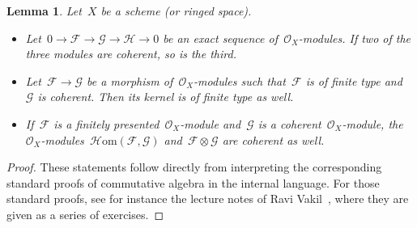 \documentclass[10pt]{amsart}
\theoremstyle{definition}
\theoremstyle{plain}
\newtheorem{lemma}[defn]{Lemma}
\theoremstyle{remark}
\newcommand{\F}{\mathcal{F}}
\renewcommand{\G}{\mathcal{G}}
\renewcommand{\H}{\mathcal{H}}
\renewcommand{\O}{\mathcal{O}}
\newcommand{\HOM}{\mathcal{H}\mathrm{om}}
\newcommand{\?}{\,{:}\,}
\renewcommand{\_}{\mathpunct{.}\,}
\begin{document}
\begin{lemma}\label{lemma:coherent-stuff}
Let~$X$ be a scheme (or ringed space).
\begin{itemize}
\item Let~$0 \to \F \to \G \to \H \to 0$ be an exact sequence
of~$\O_X$-modules. If two of the three modules are coherent, so is the third.
\item Let~$\F \to \G$ be a morphism of~$\O_X$-modules such that~$\F$ is
of finite type and~$\G$ is coherent. Then its kernel is of finite type as well.
\item If~$\F$ is a finitely presented~$\O_X$-module and~$\G$ is a
coherent~$\O_X$-module, the~$\O_X$-modules~$\HOM(\F,\G)$ and~$\F \otimes \G$
are coherent as well.
\end{itemize}
\end{lemma}
\begin{proof}These statements follow directly from interpreting the
corresponding standard proofs of commutative algebra in the internal language.
For those standard proofs, see for instance the lecture notes of Ravi
Vakil~\cite[Section~13.8]{vakil:foag}, where they are given as a series of
exercises.
\end{proof}
\end{document}
